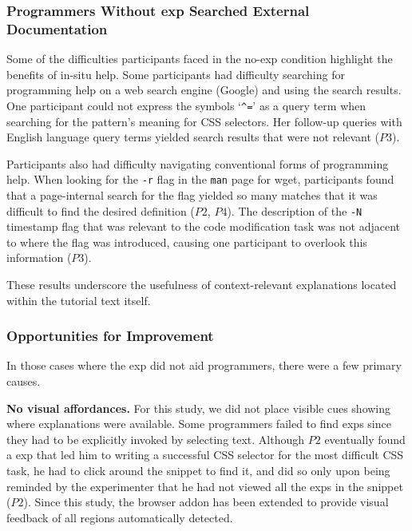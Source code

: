 \subsubsection{Programmers Without \Gls{exp} Searched External Documentation}

Some of the difficulties participants faced in the no-\gls{exp} condition  highlight the benefits of in-situ help.
Some participants had difficulty searching for programming help on a web search engine (Google) and using the search results.
One participant could not express the symbols `\texttt{\^{}=}' as a query term when searching for the pattern's meaning for CSS selectors.
Her follow-up queries with English language query terms  yielded search results that were not relevant ($P3$).

Participants also had difficulty navigating conventional forms of programming help.
When looking for the \texttt{-r} flag in the \texttt{man} page for wget, participants found that a page-internal search for the flag yielded so many matches that it was difficult to find the desired definition ($P2$, $P4$).
The description of the \texttt{-N} timestamp flag that was relevant to the code modification task was not adjacent to where the flag was introduced, causing one participant to overlook this information ($P3$).

These results underscore the usefulness of context-relevant explanations located within the tutorial text itself.

\subsubsection{Opportunities for Improvement}
In those cases where the \gls{exp} did not aid programmers, there were a few primary causes.

{\bf No visual affordances.} For this study, we did not place visible cues showing where explanations were available.
Some programmers failed to find \glspl{exp} since they had to be explicitly invoked by selecting text.
Although $P2$ eventually found a \gls{exp} that led him to writing a successful CSS selector for the most difficult CSS task, he had to click around the snippet to find it, and did so only upon being reminded by the experimenter that he had not viewed all the \glspl{exp} in the snippet ($P2$).
\fi
Since this study, the browser addon has been extended to provide visual feedback of all regions automatically detected.

